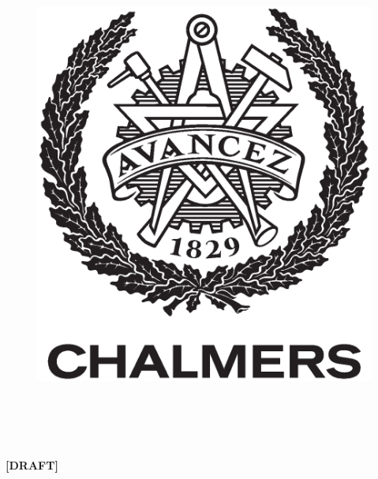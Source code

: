 \begin{center}
\begin{figure}[H]
		\includegraphics[width=0.2\pdfpagewidth]{template/figures/AvancezChalmers_black_centered.eps} \\
		\fi
		\end{figure}	\vspace{5mm}

		\thesisDepartment\\
		\ifx\thesisGroup\undefined
		\else
		\thesisGroup\\
		\fi
		\textsc{\thesisUniversity}\\
		\thesisLocation\ \thesisYear\\
	\else
		\vspace{5cm}
		\textbf{\Huge [DRAFT]}
	\fi
\end{center}
\endgroup
